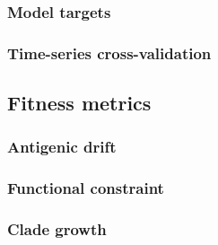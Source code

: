 \subsubsection*{Model targets}

\subsubsection*{Time-series cross-validation}

\subsection*{Fitness metrics}

\subsubsection*{Antigenic drift}

\subsubsection*{Functional constraint}

\subsubsection*{Clade growth}
